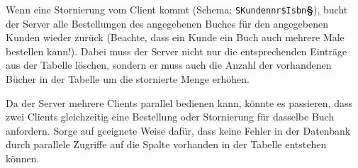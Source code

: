 Wenn eine Stornierung vom Client kommt (Schema:
\lstinline|SKundennr$Isbn|\textbf{§}), bucht der Server alle Bestellungen des
angegebenen Buches für den angegebenen Kunden wieder zurück (Beachte, dass ein
Kunde ein Buch auch mehrere Male bestellen kann!). Dabei muss der Server nicht
nur die entsprechenden Einträge aus der Tabelle 
löschen, sondern er muss auch die Anzahl der vorhandenen Bücher in der Tabelle
 um die stornierte Menge erhöhen.

Da der Server mehrere Clients parallel bedienen kann, könnte es passieren, dass
zwei Clients gleichzeitig eine Bestellung oder Stornierung für dasselbe Buch
anfordern. Sorge auf geeignete Weise dafür, dass keine Fehler in der Datenbank
durch parallele Zugriffe auf die Spalte vorhanden in der Tabelle
 entstehen können.
